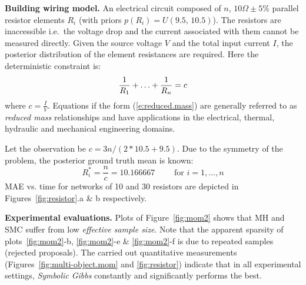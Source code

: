 \documentclass{article} %
\newcommand{\pr}{p}
\begin{document}
{\bf Building wiring model. } 
An electrical circuit composed of $n$, $10\Omega\pm5\%$ parallel resistor elements $R_i$
(with priors $\pr(R_i) = U(9.5, \, 10.5)$).
The resistors are inaccessible i.e.\ the voltage drop and the current associated with them cannot be measured directly.
Given the source voltage $V$ and the total input current $I$, the posterior distribution of the element resistances are required.
Here the deterministic constraint is:
\begin{equation} \footnotesize 
\label{e:reduced.mass}
 \frac{1}{R_1} + \ldots + \frac{1}{R_n} = c
\end{equation}
where $c = \frac{I}{V}$.
Equations if the form (\ref{e:reduced.mass}) are generally referred to as \emph{reduced mass} relationships and 
have applications in the electrical, thermal, hydraulic and mechanical engineering domains.

Let the observation be $c = {3n}/{(2*10.5 + 9.5)}$.
Due to the symmetry of the problem, the posterior ground truth mean is known:
\begin{equation*}
R_i^* = \frac{n}{c} = 10.166667\qquad \text{ for } i = 1, \ldots, n
\end{equation*}
MAE vs. time for networks of 10 and 30 resistors are depicted in 
Figures~\ref{fig:resistor}.a \& b respectively.

{\bf Experimental evaluations.}
Plots of Figure~\ref{fig:mom2} shows that MH and SMC suffer from low \emph{effective sample size}. 
Note that the apparent sparsity of plots~\ref{fig:mom2}-b, \ref{fig:mom2}-e \& \ref{fig:mom2}-f is due to repeated samples (rejected proposals).
%
The carried out quantitative measurements 
(Figures~\ref{fig:multi-object.mom} and \ref{fig:resistor}) 
indicate that in all experimental settings,
\emph{Symbolic Gibbs} constantly and significantly performs the best.
\end{document}
